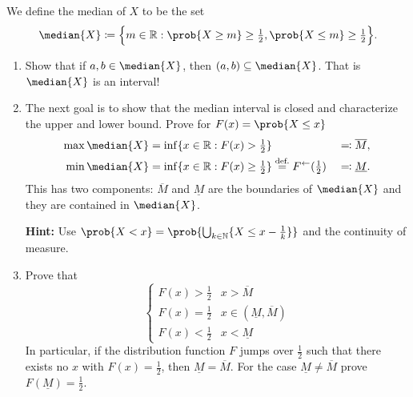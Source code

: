 \begin{exercise}[subtitle={Median -- Projection in \(L^1\) \Coffeecup\Coffeecup}]
	We define the median of \(X\) to be the set
    \[
        \median{X} \coloneq \set[\Big]{m \in \real : \prob{X \ge m}\ge \tfrac12, \prob{X\le m} \ge \tfrac12}.
    \]
	\begin{enumerate}[label=(\alph*), noitemsep]
        \item\label{it: (median) interval}
        Show that if \(a,b\in \median{X}\), then \((a,b) \subseteq \median{X}\).
        That is \(\median{X}\) is an interval!

        \item\label{it: (median) interval boundaries}
        The next goal is to show that the median interval is closed
        and characterize the upper and lower bound. Prove for \(F(x) = \prob{X\le x}\)
        \begin{alignat*}{2}
            \max \median{X} &= \inf \set{x \in \real : F(x) > \tfrac12}
            &&\eqcolon \overline{M},
            \\
            \min \median{X} &= \inf \set{x \in \real : F(x) \ge \tfrac12} \overset{\text{def.}}= F^{\leftarrow}(\tfrac12)
            &&\eqcolon \underline{M}.
        \end{alignat*}
        This has two components: \(\overline{M}\) and \(\underline{M}\) are the boundaries of \(\median{X}\)
        and they are contained in \(\median{X}\).

        \textbf{Hint:} Use \(\prob{X < x} = \prob{\bigcup_{k\in \nat}\set{X \le x - \tfrac1k}}\) and the continuity of measure.

        \item\label{it: characterization of distribution function}
        Prove that
        \[
            \begin{cases}
                F(x) > \tfrac12 & x > \overline{M} 
                \\
                F(x) = \tfrac12 & x \in (\underline{M}, \overline{M})
                \\
                F(x) < \tfrac12  & x < \underline{M}
            \end{cases}
        \]
        In particular, if the distribution function \(F\) jumps over
        \(\tfrac12\) such that there exists no \(x\) with \(F(x) = \frac12\),
        then \(\underline{M} = \overline{M}\). For the case
        \(\underline{M} \neq \overline{M}\) prove \(F(\underline{M})= \tfrac12\).


\end{enumerate}
\end{exercise}
